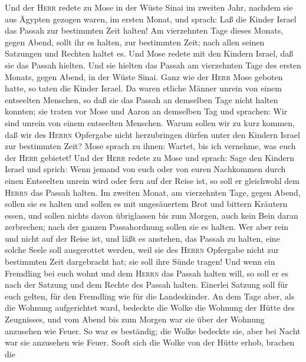  Und der \textsc{Herr} redete zu Mose in der Wüste Sinai
im zweiten Jahr, nachdem sie aus Ägypten gezogen waren, im ersten Monat,
und sprach:  Laß die Kinder Israel das Passah zur
bestimmten Zeit halten!  Am vierzehnten Tage dieses
Monats, gegen Abend, sollt ihr es halten, zur bestimmten Zeit; nach
allen seinen Satzungen und Rechten haltet es.  Und Mose
redete mit den Kindern Israel, daß sie das Passah hielten.
 Und sie hielten das Passah am vierzehnten Tage des ersten
Monats, gegen Abend, in der Wüste Sinai. Ganz wie der \textsc{Herr} Mose
geboten hatte, so taten die Kinder Israel.  Da waren
etliche Männer unrein von einem entseelten Menschen, so daß sie das
Passah an demselben Tage nicht halten konnten; sie traten vor Mose und
Aaron an demselben Tag und sprachen:  Wir sind unrein von
einem entseelten Menschen. Warum sollen wir zu kurz kommen, daß wir des
\textsc{Herrn} Opfergabe nicht herzubringen dürfen unter den Kindern
Israel zur bestimmten Zeit?  Mose sprach zu ihnen: Wartet,
bis ich vernehme, was euch der \textsc{Herr} gebietet! 
Und der \textsc{Herr} redete zu Mose und sprach:  Sage
den Kindern Israel und sprich: Wenn jemand von euch oder von euren
Nachkommen durch einen Entseelten unrein wird oder fern auf der Reise
ist, so soll er gleichwohl dem \textsc{Herrn} das Passah halten.
 Im zweiten Monat, am vierzehnten Tage, gegen Abend,
sollen sie es halten und sollen es mit ungesäuertem Brot und bittern
Kräutern essen,  und sollen nichts davon übriglassen bis
zum Morgen, auch kein Bein daran zerbrechen; nach der ganzen
Passahordnung sollen sie es halten.  Wer aber rein und
nicht auf der Reise ist, und läßt es anstehen, das Passah zu halten,
eine solche Seele soll ausgerottet werden, weil sie des \textsc{Herrn}
Opfergabe nicht zur bestimmten Zeit dargebracht hat; sie soll ihre Sünde
tragen!  Und wenn ein Fremdling bei euch wohnt und dem
\textsc{Herrn} das Passah halten will, so soll er es nach der Satzung
und dem Rechte des Passah halten. Einerlei Satzung soll für euch gelten,
für den Fremdling wie für die Landeskinder.  An dem Tage
aber, als die Wohnung aufgerichtet ward, bedeckte die Wolke die Wohnung
der Hütte des Zeugnisses, und vom Abend bis zum Morgen war sie über der
Wohnung anzusehen wie Feuer.  So war es beständig; die
Wolke bedeckte sie, aber bei Nacht war sie anzusehen wie Feuer.
 Sooft sich die Wolke von der Hütte erhob, brachen die
